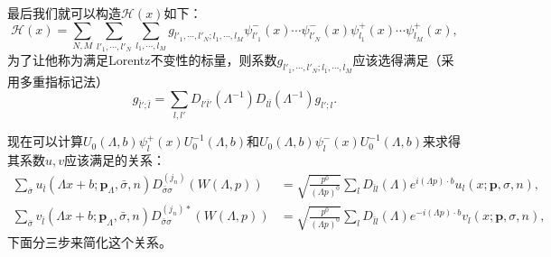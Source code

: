 \documentclass[10pt]{extbook}
\theoremstyle{plain}%
\begin{document}
最后我们就可以构造$\mathscr{H}(x)$如下：
\[
\mathscr{H}(x)=\sum_{N,M}\sum_{l'_1,\cdots,l'_N}
\sum_{l_1,\cdots,l_M}g_{l'_1,\cdots,l'_N;l_1,\cdots,l_M}\psi_{l'_1}^{-}(x)\cdots \psi_{l'_N}^{-}(x)\psi_{l_1}^{+}(x)\cdots \psi_{l_M}^{+}(x),
\]
为了让他称为满足Lorentz不变性的标量，则系数$g_{l'_1,\cdots,l'_N;l_1,\cdots,l_M}$应该选得满足（采用多重指标记法）
\[
	g_{\bar{l}';\bar{l}}=\sum_{l,l'}D_{l'\bar{l}'}(\Lambda^{-1})D_{l\bar{l}}(\Lambda^{-1})g_{l';l}.
\]

现在可以计算$U_0(\Lambda,b)\psi_l^{+}(x)U_0^{-1}(\Lambda,b)$和$U_0(\Lambda,b)\psi_l^{-}(x)U_0^{-1}(\Lambda,b)$来求得其系数$u,v$应该满足的关系：
\begin{equation}
	\begin{split}
		\sum_{\bar{\sigma}}u_{\bar{l}}(\Lambda x+b;\mathbf{p}_\Lambda,\bar{\sigma},n)D^{(j_n)}_{\bar{\sigma}\sigma}\left(W(\Lambda,p)\right)&=\sqrt{\frac{p^0}{(\Lambda p)^0}}\sum_{l} D_{\bar{l}l}(\Lambda)e^{i(\Lambda p)\cdot b}u_{l}(x;\mathbf{p},\sigma,n),\\
		\sum_{\bar{\sigma}}v_{\bar{l}}(\Lambda x+b;\mathbf{p}_\Lambda,\bar{\sigma},n)D^{(j_n)*}_{\bar{\sigma}\sigma}\left(W(\Lambda,p)\right)&=\sqrt{\frac{p^0}{(\Lambda p)^0}}\sum_{l} D_{\bar{l}l}(\Lambda)e^{-i(\Lambda p)\cdot b}v_{l}(x;\mathbf{p},\sigma,n),
	\end{split}
\label{xishu}
\end{equation}
下面分三步来简化这个关系。
\end{document}
